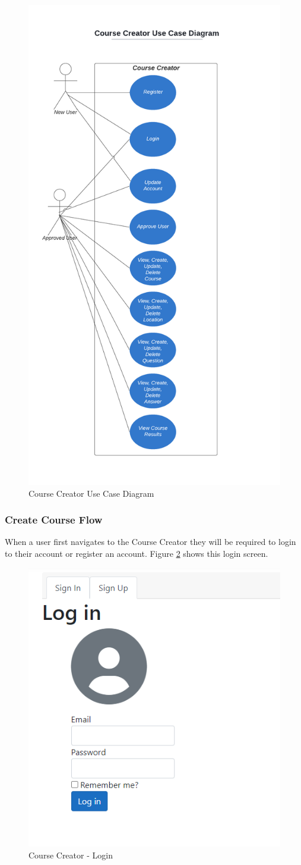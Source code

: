 \begin{figure}[htb]
	\centering
	\includegraphics[width=.6\textwidth]{Requirements/assets/course-creator-use-case-diagram.png}
	\caption[Course Creator Use Case Diagram]{\label{Course Creator Use Case Diagram}Course Creator Use Case Diagram}
\end{figure}

\subsubsection{Create Course Flow}
When a user first navigates to the Course Creator they will be required to login to their account or register an account. Figure \ref{Course Creator Login} shows this login screen.

\begin{figure}[htb]
	\centering
	\includegraphics[width=.6\textwidth]{Requirements/assets/cc-login.png}
	\caption[Course Creator - Login]{\label{Course Creator Login}Course Creator - Login}
\end{figure}

